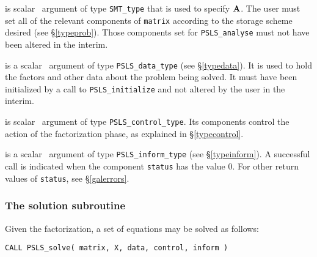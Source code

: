 \documentclass{galahad}
\newcommand{\packagename}{PSLS}
\begin{document}
\begin{description}

 is scalar \intentin\ argument of type {\tt SMT\_type}
that is used to specify ${\mathbf{A}}$.
The user must set all of the relevant components of {\tt matrix} according
to the storage scheme desired (see \S\ref{typeprob}). Those components
set for {\tt \packagename\_analyse} must not have been altered in the interim.

 is a scalar \intentinout\ argument of type
{\tt \packagename\_data\_type}
(see \S\ref{typedata}). It is used to hold the factors and other
data about the problem being solved.
It must have been initialized by a call to
{\tt \packagename\_ini\-tialize} and not altered by the user in the interim.

 is scalar \intentin\ argument of type
{\tt \packagename\_control\_type}. Its components control the action
of the factorization phase, as explained in
\S\ref{typecontrol}.

 is a scalar \intentinout\ argument of type
{\tt \packagename\_inform\_type}
(see \S\ref{typeinform}).
A successful call is indicated when the  component {\tt status} has the value 0.
For other return values of {\tt status}, see \S\ref{galerrors}.

\end{description}


\subsubsection{The solution subroutine}
\label{solve}
Given the factorization, a set of equations may be solved as follows:

\hskip0.5in
{\tt CALL \packagename\_solve( matrix, X, data, control, inform )}
\end{document}
